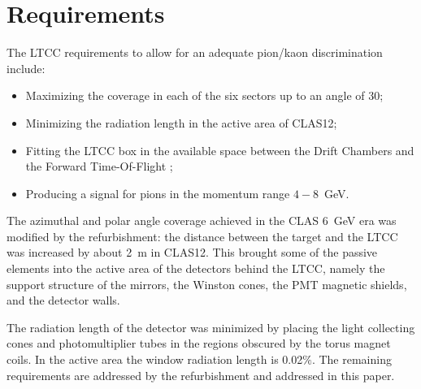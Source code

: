 \section{Requirements}

The LTCC requirements to allow for an adequate pion/kaon discrimination include:


\begin{itemize}
	\item Maximizing the coverage in each of the six sectors up to an angle of 30\mdeg;
	\item Minimizing the radiation length in the active area of CLAS12;
	\item Fitting the LTCC box in the available space between the Drift Chambers \cite{dc-nim} and the Forward
          Time-Of-Flight \cite{ftof-nim};
	\item Producing a signal for pions in the momentum range $4-8$~GeV.
\end{itemize}

The azimuthal and polar angle coverage achieved in the CLAS 6~GeV era was modified by the refurbishment:
the distance between the target and the LTCC was increased by about 2~m in CLAS12. This brought some of the passive
elements into the active area of the detectors behind the LTCC, namely the support structure of the mirrors, the Winston
cones, the PMT magnetic shields, and the detector walls.

The radiation length of the detector was minimized by placing the light collecting cones and photomultiplier tubes
in the regions obscured by the torus magnet coils. In the active area the window radiation length is 0.02$\%$.
The remaining requirements are addressed by the refurbishment and addressed in this paper.
